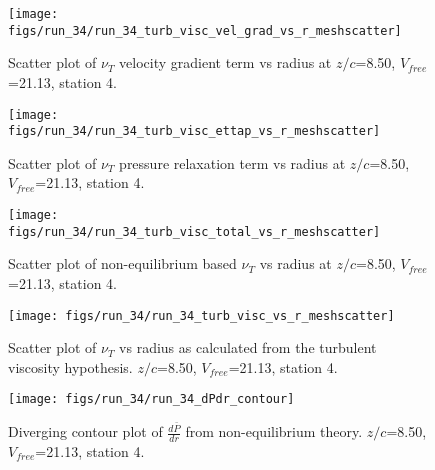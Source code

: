 \begin{figure}[H]
\centering
\texttt{[image: figs/run\_34/run\_34\_turb\_visc\_vel\_grad\_vs\_r\_meshscatter]}
\caption{Scatter plot of $\nu_T$ velocity gradient term vs radius at $z/c$=8.50, $V_{free}$=21.13, station 4.}
\end{figure}


\begin{figure}[H]
\centering
\texttt{[image: figs/run\_34/run\_34\_turb\_visc\_ettap\_vs\_r\_meshscatter]}
\caption{Scatter plot of $\nu_T$ pressure relaxation term vs radius at $z/c$=8.50, $V_{free}$=21.13, station 4.}
\end{figure}


\begin{figure}[H]
\centering
\texttt{[image: figs/run\_34/run\_34\_turb\_visc\_total\_vs\_r\_meshscatter]}
\caption{Scatter plot of non-equilibrium based $\nu_T$ vs radius at $z/c$=8.50, $V_{free}$=21.13, station 4.}
\end{figure}


\begin{figure}[H]
\centering
\texttt{[image: figs/run\_34/run\_34\_turb\_visc\_vs\_r\_meshscatter]}
\caption{Scatter plot of $\nu_T$ vs radius as calculated from the turbulent viscosity hypothesis. $z/c$=8.50, $V_{free}$=21.13, station 4.}
\end{figure}


\begin{figure}[H]
\centering
\texttt{[image: figs/run\_34/run\_34\_dPdr\_contour]}
\caption{Diverging contour plot of $\frac{d\bar{P}}{dr}$ from non-equilibrium theory. $z/c$=8.50, $V_{free}$=21.13, station 4.}
\end{figure}



